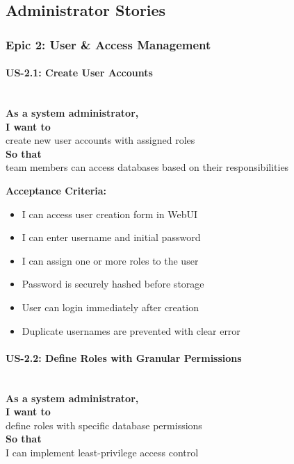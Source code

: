 \subsection{Administrator Stories}

\subsubsection{Epic 2: User \& Access Management}

\paragraph{US-2.1: Create User Accounts}
\mbox{}\\[0.5em]

\noindent\textbf{As a system administrator,} \\
\textbf{I want to} \\
create new user accounts with assigned roles \\
\textbf{So that} \\
team members can access databases based on their responsibilities

\noindent\textbf{Acceptance Criteria:}
\begin{itemize}
    \item I can access user creation form in WebUI
    \item I can enter username and initial password
    \item I can assign one or more roles to the user
    \item Password is securely hashed before storage
    \item User can login immediately after creation
    \item Duplicate usernames are prevented with clear error
\end{itemize}

\paragraph{US-2.2: Define Roles with Granular Permissions}
\mbox{}\\[0.5em]

\noindent\textbf{As a system administrator,} \\
\textbf{I want to} \\
define roles with specific database permissions \\
\textbf{So that} \\
I can implement least-privilege access control

